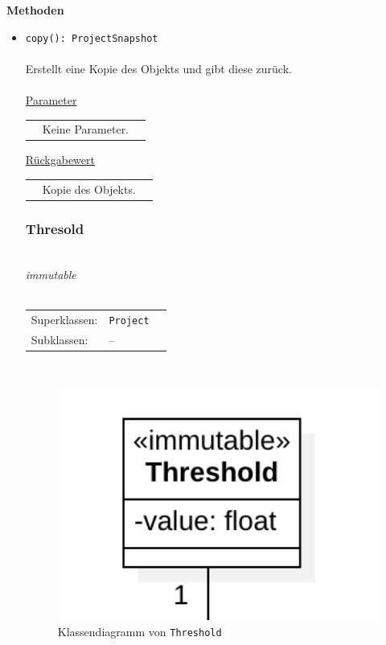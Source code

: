 \documentclass{article}
\begin{document}
\textbf{Methoden}
\begin{itemize}\setlength\itemsep{3em}
\item \texttt{copy(): ProjectSnapshot}\\\\
Erstellt eine Kopie des Objekts und gibt diese zurück.
\\\\
\underline{Parameter}\\
\begin{tabular}{lll}
 & Keine Parameter.
\end{tabular}

\underline{Rückgabewert}\\
\begin{tabular}{lll}
 & Kopie des Objekts.\\
\end{tabular}

\subsubsection*{\large{\textbf{Thresold}\label{cls:Threshold}}}\\
\textit{\flqq{}immutable\frqq}\normalsize\\\\
\begin{tabular}{lll}
 Superklassen: & \texttt{Project}\\
 Subklassen: & --
\end{tabular}\\
\begin{figure}[H]%
    \centering
    \includegraphics[width=13cm]{entwurf/Entwurf_dokument/img/cls/model/Threshold.png}
    \caption{Klassendiagramm von \texttt{Threshold}}
\end{figure}


\end{itemize}
\end{document}

